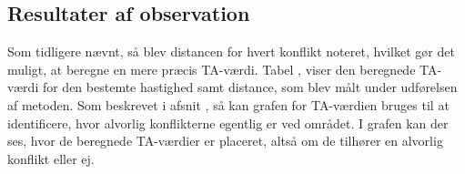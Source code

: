 \subsection{Resultater af observation}
\label{sec:resultafobs}
Som tidligere nævnt, så blev distancen for hvert konflikt noteret, hvilket gør det muligt, at beregne en mere præcis TA-værdi. Tabel , viser den beregnede TA-værdi for den bestemte hastighed samt distance, som blev målt under udførelsen af metoden.
Som beskrevet i afsnit , så kan grafen for TA-værdien bruges til at identificere, hvor alvorlig konflikterne egentlig er ved området. I grafen kan der ses, hvor de beregnede TA-værdier er placeret, altså om de tilhører en alvorlig konflikt eller ej.
